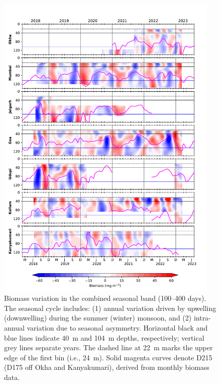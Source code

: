 \documentclass[authoryear,review,11pt]{elsarticle}
\begin{document}
\begin{figure}[htbp]
	\centering
	\includegraphics[width=0.95\textwidth]{./figures/filtered_biomass_seasonal_100_400days.pdf} 
	\captionsetup{justification=justified,font=footnotesize,skip=0.05\baselineskip,width=\textwidth}
	\caption{Biomass variation in the combined seasonal band (100--400 days). The seasonal cycle includes: (1) annual variation driven by upwelling (downwelling) during the summer (winter) monsoon, and (2) intra-annual variation due to seasonal asymmetry. Horizontal black and blue lines indicate 40~m and 104~m depths, respectively; vertical grey lines separate years. The dashed line at 22~m marks the upper edge of the first bin (i.e., 24~m). Solid magenta curves denote D215 (D175 off Okha and Kanyakumari), derived from monthly biomass data.}
	\label{fig:filtered_biomass_seasonal_100_400days}
\end{figure}
\end{document}
